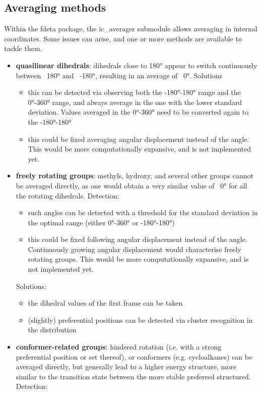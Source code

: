 \documentclass[twoside, 12pt]{article}
\begin{document}
\subsection{Averaging methods}
Within the fdeta package, the ic\_averager submodule allows averaging in internal coordinates.
Some issues can arise, and one or more methods are available to tackle them.
\begin{itemize}
 \item \textbf{quasilinear dihedrals}: dihedrals close to 180° appear to switch continuously between ~180° and ~-180°, resulting in an average of ~0°. Solutions
\begin{itemize}
 \item this can be detected via observing both the -180°-180° range and the 0°-360° range, and always average in the one with the lower standard deviation. Values averaged in the 0°-360° need to be converted again to the -180°-180°
 \item this could be fixed averaging angular displacement instead of the angle. This would be more computationally expansive, and is not implemented yet.
\end{itemize}
\item \textbf{freely rotating groups}: methyls, hydroxy, and several other groups cannot be averaged directly, as one would obtain a very similar value of ~0° for all the rotating dihedrals. Detection:
\begin{itemize}
 \item such angles can be detected with a threshold for the standard deviation in the optimal range (either 0°-360° or -180°-180°)
 \item this could be fixed following angular displacement instead of the angle. Continuously growing angular displacement would characterise freely rotating groups. This would be more computationally expansive, and is not implemented yet.
 \end{itemize}
Solutions:
\begin{itemize}
 \item the dihedral values of the first frame can be taken
 \item (slightly) preferential positions can be detected via cluster recognition in the distribution
\end{itemize}
\item \textbf{conformer-related groups}: hindered rotation (i.e. with a strong preferential position or set thereof), or conformers (e.g. cycloalkanes) can be averaged directly, but generally lead to a higher energy structure, more similar to the transition state between the more stable preferred structured. Detection:

\end{itemize}
\end{document}
